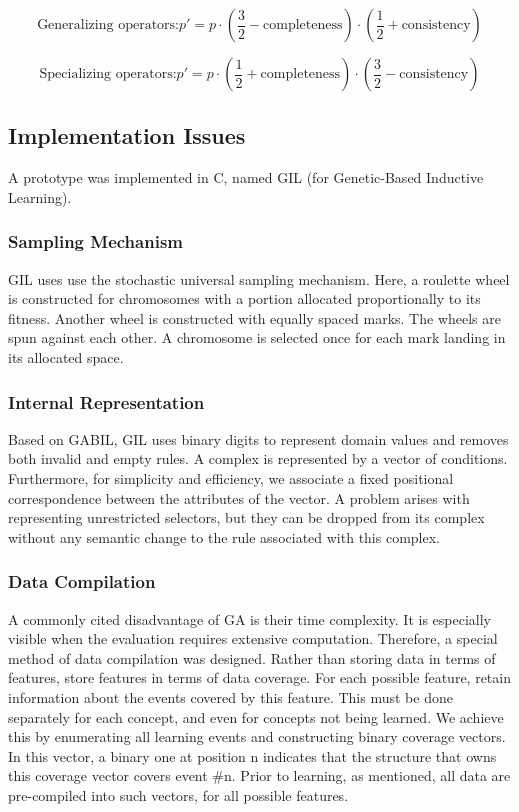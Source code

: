 \documentclass[../main.tex]{subfiles}
\begin{document}
\begin{equation}
	\text{Generalizing operators:} p' = p \cdot \left( \frac{3}{2} - \text{completeness} \right) \cdot \left(
	\frac{1}{2} + \text{consistency} \right)
\end{equation}

\begin{equation}
	\text{Specializing operators:} p' = p \cdot \left( \frac{1}{2} + \text{completeness} \right) \cdot \left(
	\frac{3}{2} - \text{consistency} \right)
\end{equation}

\subsection{Implementation Issues}

A prototype was implemented in C, named GIL (for Genetic-Based Inductive Learning).

\subsubsection{Sampling Mechanism}

GIL uses use the stochastic universal sampling mechanism. Here, a roulette wheel is constructed for chromosomes with a
portion allocated proportionally to its fitness. Another wheel is constructed with equally spaced marks. The wheels are
spun against each other. A chromosome is selected once for each mark landing in its allocated space.

\subsubsection{Internal Representation}

Based on GABIL, GIL uses  binary digits to represent domain values and removes both invalid and empty rules. A complex
is represented by a vector of conditions. Furthermore, for simplicity and efficiency, we associate a fixed positional
correspondence between the attributes of the vector. A problem arises with representing unrestricted selectors, but
they can be dropped from its complex without any semantic change to the rule associated with this complex.

\subsubsection{Data Compilation}
A commonly cited disadvantage of GA is their time complexity. It is especially visible when the evaluation requires
extensive computation. Therefore, a special method of data compilation was designed. Rather than storing data in terms
of features, store features in terms of data coverage. For each possible feature, retain information about the events
covered by this feature. This must be done separately for each concept, and even for concepts not being learned. We
achieve this by enumerating all learning events and constructing binary coverage vectors. In this vector, a binary one
at position n indicates that the structure that owns this coverage vector covers event \#n. Prior to learning, as
mentioned, all data are pre-compiled into such vectors, for all possible features.
\end{document}
